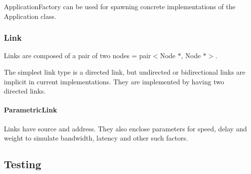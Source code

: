 \begin{DoxyItemize}
\item Application\+Factory can be used for spawning concrete implementations of the Application class.
\end{DoxyItemize}

\subsubsection*{Link}


\begin{DoxyItemize}
\item Links are composed of a pair of two nodes = pair$<$\+Node $\ast$, Node $\ast$$>$.
\item The simplest link type is a directed link, but undirected or bidirectional links are implicit in current implementations. They are implemented by having two directed links.
\end{DoxyItemize}

\paragraph*{Parametric\+Link}


\begin{DoxyItemize}
\item Links have source and address. They also enclose parameters for speed, delay and weight to simulate bandwidth, latency and other such factors.
\end{DoxyItemize}

\subsection*{Testing}


